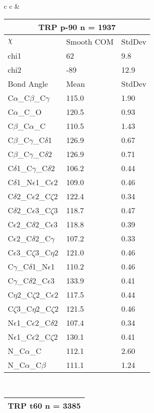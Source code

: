 \begin{longtable}{ c c }
  &
  \begin{tabular}{ l l l }
  \toprule
  \multicolumn{3}{c}{TRP \textbf{p-90} n = 1937} \\ \toprule
  $\chi$       & Smooth COM & StdDev \\ \midrule
  chi1 & 62 & 9.8 \\ 
  chi2 & -89 & 12.9 \\ \midrule
  Bond Angle   & Mean     & StdDev \\ \midrule
  C$\alpha$\_C$\beta$\_C$\gamma$ & 115.0 & 1.90\\
  C$\alpha$\_C\_O & 120.5 & 0.93\\
  C$\beta$\_C$\alpha$\_C & 110.5 & 1.43\\
  C$\beta$\_C$\gamma$\_C$\delta$1 & 126.9 & 0.67\\
  C$\beta$\_C$\gamma$\_C$\delta$2 & 126.9 & 0.71\\
  C$\delta$1\_C$\gamma$\_C$\delta$2 & 106.2 & 0.44\\
  C$\delta$1\_N$\epsilon$1\_C$\epsilon$2 & 109.0 & 0.46\\
  C$\delta$2\_C$\epsilon$2\_C$\zeta$2 & 122.4 & 0.34\\
  C$\delta$2\_C$\epsilon$3\_C$\zeta$3 & 118.7 & 0.47\\
  C$\epsilon$2\_C$\delta$2\_C$\epsilon$3 & 118.8 & 0.39\\
  C$\epsilon$2\_C$\delta$2\_C$\gamma$ & 107.2 & 0.33\\
  C$\epsilon$3\_C$\zeta$3\_C$\eta$2 & 121.0 & 0.46\\
  C$\gamma$\_C$\delta$1\_N$\epsilon$1 & 110.2 & 0.46\\
  C$\gamma$\_C$\delta$2\_C$\epsilon$3 & 133.9 & 0.41\\
  C$\eta$2\_C$\zeta$2\_C$\epsilon$2 & 117.5 & 0.44\\
  C$\zeta$3\_C$\eta$2\_C$\zeta$2 & 121.5 & 0.46\\
  N$\epsilon$1\_C$\epsilon$2\_C$\delta$2 & 107.4 & 0.34\\
  N$\epsilon$1\_C$\epsilon$2\_C$\zeta$2 & 130.1 & 0.41\\
  N\_C$\alpha$\_C & 112.1 & 2.60\\
  N\_C$\alpha$\_C$\beta$ & 111.1 & 1.24\\
  \bottomrule
  \end{tabular}
  \\
  \begin{tabular}{ l l l }
  \toprule
  \multicolumn{3}{c}{TRP \textbf{t60} n = 3385} \\ \toprule

\end{tabular}
\end{longtable}
